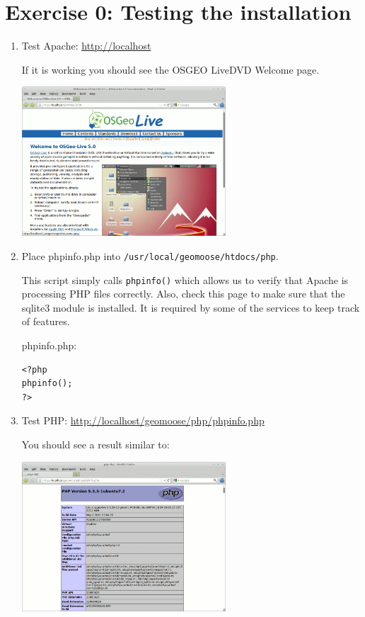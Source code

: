 \documentclass[letterpaper]{article}
\begin{document}
\pagestyle{fancy}

\section*{Exercise 0: Testing the installation}

\begin{enumerate}
\item Test Apache: \url{http://localhost}

  If it is working you should see the OSGEO LiveDVD Welcome page.
  \begin{center}
    \includegraphics[width=3in]{images/00-osgeolive.png}
  \end{center}

\item Place phpinfo.php into \texttt{/usr/local/geomoose/htdocs/php}.

  This script simply calls \texttt{phpinfo()} which allows us to
  verify that Apache is processing PHP files correctly.  Also, check
  this page to make sure that the sqlite3 module is installed.  It is
  required by some of the services to keep track of features.

phpinfo.php:
\begin{verbatim}
<?php
phpinfo();
?>
\end{verbatim}

\item Test PHP: \url{http://localhost/geomoose/php/phpinfo.php}

  You should see a result similar to:
  \begin{center}
    \includegraphics[width=3in]{images/00-php.png}
  \end{center}


\end{enumerate}
\end{document}
